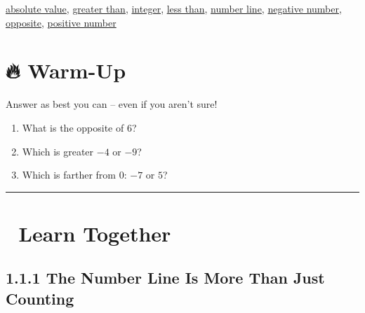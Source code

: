 \documentclass[
  letterpaper,
]{scrrept}
\begin{document}
\begin{tcolorbox}[enhanced jigsaw, colframe=quarto-callout-note-color-frame, opacitybacktitle=0.6, arc=.35mm, coltitle=black, leftrule=.75mm, toprule=.15mm, opacityback=0, bottomrule=.15mm, breakable, title={📚 Vocabulary}, colback=white, bottomtitle=1mm, toptitle=1mm, titlerule=0mm, rightrule=.15mm, left=2mm, colbacktitle=quarto-callout-note-color!10!white]

\href{./glossary.html\#glossary-absolute-value}{absolute value},
\href{./glossary.html\#glossary-greater-than}{greater than},
\href{./glossary.html\#glossary-integer}{integer},
\href{./glossary.html\#glossary-less-than}{less than},
\href{./glossary.html\#glossary-number-line}{number line},
\href{./glossary.html\#glossary-negative-number}{negative number},
\href{./glossary.html\#glossary-opposite}{opposite},
\href{./glossary.html\#glossary-positive-number}{positive number}

\end{tcolorbox}

\section*{🔥 Warm-Up}\label{warm-up}


Answer as best you can -- even if you aren't sure!

\begin{enumerate}
\def\labelenumi{\arabic{enumi}.}
\item
  What is the opposite of \(6\)?
\item
  Which is greater \(-4\) or \(-9\)?
\item
  Which is farther from \(0\): \(-7\) or \(5\)?
\end{enumerate}

\begin{center}\rule{0.5\linewidth}{0.5pt}\end{center}

\section*{👥 Learn Together}\label{learn-together}


\subsection*{1.1.1 The Number Line Is More Than Just
Counting}\label{the-number-line-is-more-than-just-counting}
\end{document}
